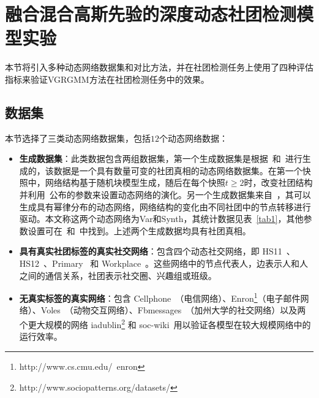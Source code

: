 \section{融合混合高斯先验的深度动态社团检测模型实验\label{chap6:experiment}}

本节将引入多种动态网络数据集和对比方法，并在社团检测任务上使用了四种评估指标来验证VGRGMM方法在社团检测任务中的效果。

\subsection{数据集}
本节选择了三类动态网络数据集，包括$12$个动态网络数据：
\begin{itemize}
    \item \textbf{生成数据集}：此类数据包含两组数据集，第一个生成数据集是根据~\cite{kim2009particle}和~\cite{Lin.2009.Tseng}进行生成的，该数据是一个具有数量可变的社团真相的动态网络数据集。在第一个快照中，网络结构基于随机块模型生成，随后在每个快照$t \ge 2$时，改变社团结构并利用~\cite{Lin.2009.Tseng}公布的参数来设置动态网络的演化。另一个生成数据集来自~\cite{ditursi2017local}，其可以生成具有幂律分布的动态网络，网络结构的变化由不同社团中的节点转移进行驱动。本文称这两个动态网络为Var和Synth，其统计数据见表~\ref{tab1}，其他参数设置可在~\cite{kim2009particle}和~\cite{Lin.2009.Tseng}中找到。上述两个生成数据均具有社团真相。
    \item \textbf{具有真实社团标签的真实社交网络}：包含四个动态社交网络，即 HS11~\cite{malizia2025hyperedge}、HS12~\cite{malizia2025hyperedge}、Primary~\cite{malizia2025hyperedge} 和 Workplace~\cite{genois2014data}。这些网络中的节点代表人，边表示人和人之间的通信关系，社团表示社交圈、兴趣组或班级。
    \item \textbf{无真实标签的真实网络}：包含 Cellphone~\cite{folino2013evolutionary}（电信网络）、Enron\footnote{http://www.cs.cmu.edu/~enron}（电子邮件网络）、Voles~\cite{rossi2015network}（动物交互网络）、Fbmessages~\cite{rossi2015network}（加州大学的社交网络）以及两个更大规模的网络 iadublin\footnote{http://www.sociopatterns.org/datasets/} 和 soc-wiki~\cite{rossi2015network}用以验证各模型在较大规模网络中的运行效率。
\end{itemize}

